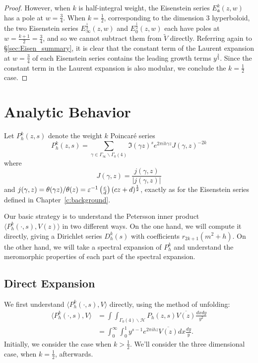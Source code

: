 \begin{proof}
However, when $k$ is half-integral weight, the Eisenstein series
$E^k_\mathfrak{a}(z,w)$ has a pole at $w = \frac{3}{4}$.
When $k = \frac{1}{2}$, corresponding to the dimension $3$ hyperboloid,
the two Eisenstein series $E^{\frac{1}{2}}_\infty(z,w)$ and
$E_0^{\frac{1}{2}}(z,w)$ each have poles at
$w = \frac{k+1}{2} = \frac{3}{4}$, and so we cannot subtract
them from $\widetilde{V}$ directly.
Referring again to \S\ref{sec:Eisen_summary}, it is clear that the constant term of the
Laurent expansion at $w = \frac{3}{4}$ of each Eisenstein series contains the leading
growth terms $y^{\frac{3}{4}}$.
Since the constant term in the Laurent expansion is also modular, we conclude the $k =
\frac{1}{2}$ case.
%
\end{proof}




\section{Analytic Behavior}



Let $P_h^k(z,s)$ denote the weight $k$ Poincar\'e series
\begin{equation}
  P_h^k(z,s) = \sum_{\gamma \in \Gamma_\infty \backslash \Gamma_0(4)} \Im(\gamma z)^s
  e^{2\pi i h \gamma z} J(\gamma, z)^{-2k}
\end{equation}
where
\begin{equation}
  J(\gamma, z) = \frac{j(\gamma, z)}{\lvert j(\gamma, z) \rvert}
\end{equation}
and $j(\gamma, z) = \theta(\gamma z)/\theta(z) = \varepsilon^{-1} \left(\frac{c}{d}\right)
(cz+d)^{\frac{1}{2}}$, exactly as for the Eisenstein series defined in
Chapter~\ref{c:background}.


Our basic strategy is to understand the Petersson inner product $\langle P_h^k(\cdot, s),
V(z) \rangle$ in two different ways.
On the one hand, we will compute it directly, giving a Dirichlet series $D_h^k(s)$ with
coefficients $r_{2k+1}(m^2 + h)$.
On the other hand, we will take a spectral expansion of $P_h^k$ and understand the
meromorphic properties of each part of the spectral expansion.



\subsection{Direct Expansion}\label{ssec:direct_expansion}



We first understand $\langle P_h^k(\cdot, s), V \rangle$ directly, using the method of
unfolding:
\begin{align}
  \langle P_h^k(\cdot, s), V \rangle &= \int \int_{\Gamma_0(4) \backslash \mathcal{H}}
  P_h(z,s) \overline{V(z)} \frac{dx dy}{y^2} \\
  &= \int_0^\infty \int_0^1 y^{s-1} e^{2\pi i h z} \overline{V(z)} dx \frac{dy}{y}.
\end{align}
Initially, we consider the case when $k > \frac{1}{2}$.
We'll consider the three dimensional case, when $k = \frac{1}{2}$, afterwards.



